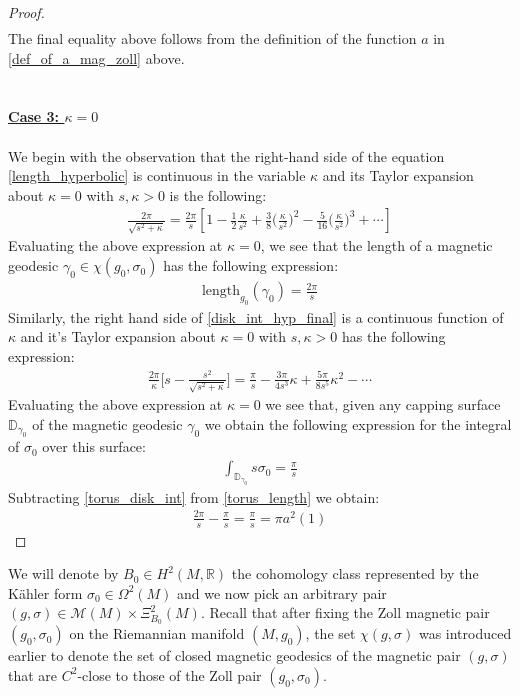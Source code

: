 \documentclass[11pt]{amsart}
\theoremstyle{plain}
\theoremstyle{definition}
\theoremstyle{remark}
\begin{document}
\begin{proof}
\begin{align}
\end{align}
The final equality above follows from the definition of the function $a$ in \eqref{def_of_a_mag_zoll} above.
\\
\\
\\
\textbf{\underline{Case 3: $\kappa =0$}}\\
\\
We begin with the observation that the right-hand side of the equation \eqref{length_hyperbolic} is continuous in the variable $\kappa$ and its Taylor expansion about $\kappa=0$ with $s,\kappa > 0$ is the following:
\begin{align}
 \frac{2\pi}{\sqrt{s^2+ \kappa }} =   \frac{2\pi}{s} \left[
1 - \frac{1}{2} \frac{\kappa}{s^2}
+ \frac{3}{8} \bigg( \frac{\kappa}{s^2} \bigg)^2
- \frac{5}{16} \bigg( \frac{\kappa}{s^2} \bigg)^3
+ \cdots
\right]
\end{align}
Evaluating the above expression at $\kappa=0$, we see that the length of a magnetic geodesic $\gamma_0 \in \chi(g_0,\sigma_0)$ has the following expression:
\begin{align}\label{torus_length}
    \text{length}_{g_0}(\gamma_0) = \frac{2\pi}{s}
\end{align}
Similarly, the right hand side of \eqref{disk_int_hyp_final} is a continuous function of $\kappa$ and it's Taylor expansion about $\kappa =0$ with $s,\kappa > 0$ has the following expression:
\begin{align}
 \frac{2\pi}{\kappa}  \Bigg[s - \frac{s^2}{\sqrt{s^2+\kappa}} \Bigg] =     \frac{\pi}{s} - \frac{3\pi}{4s^3} \kappa + \frac{5\pi}{8s^5} \kappa^2 - \cdots
\end{align}
Evaluating the above expression at $\kappa=0$ we see that, given any capping surface $\mathbb{D}_{\gamma_0}$ of the magnetic geodesic $\gamma_0$ we obtain the following expression for the integral of $\sigma_0$ over this surface:
\begin{align}\label{torus_disk_int}
    \int_{\mathbb{D}_{\gamma_0}} s\sigma_0 = \frac{\pi}{s}
\end{align}
Subtracting \eqref{torus_disk_int} from \eqref{torus_length} we obtain:
\begin{align}
    \frac{2\pi}{s} - \frac{\pi}{s} = \frac{\pi}{s} = \pi a^2(1)
\end{align}
\end{proof}
We will denote by $B_0 \in H^2(M,\mathbb{R})$ the cohomology class represented by the K\"ahler form $\sigma_0 \in \Omega^2(M)$ and we now pick an arbitrary pair $(g,\sigma) \in \mathcal{M}(M)\times \Xi^2_{B_0}(M)$. Recall that after fixing the Zoll magnetic pair $(g_0,\sigma_0)$ on the Riemannian manifold $(M,g_0)$, the set $\chi(g,\sigma)$ was introduced earlier to denote the set of closed magnetic geodesics of the magnetic pair $(g,\sigma)$ that are $C^2$-close to those of the Zoll pair $(g_0,\sigma_0)$.\\
\end{document}
